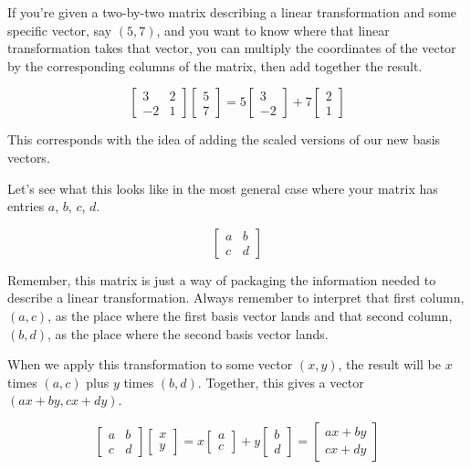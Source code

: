 If you're given a two-by-two matrix describing a linear transformation and some
specific vector, say $(5, 7)$, and you want to know where that linear
transformation takes that vector, you can multiply the coordinates of the vector
by the corresponding columns of the matrix, then add together the result.

\begin{equation*}
  \begin{bmatrix}
    3 & 2 \\
    -2 & 1
  \end{bmatrix}
  \begin{bmatrix}
    5 \\
    7
  \end{bmatrix} = 5\begin{bmatrix}
    3 \\
    -2
  \end{bmatrix} + 7\begin{bmatrix}
    2 \\
    1
  \end{bmatrix}
\end{equation*}

This corresponds with the idea of adding the scaled versions of our new basis
vectors.

Let's see what this looks like in the most general case where your matrix has
entries $a$, $b$, $c$, $d$.

\begin{equation*}
  \begin{bmatrix}
    a & b \\
    c & d
  \end{bmatrix}
\end{equation*}

Remember, this matrix is just a way of packaging the information needed to
describe a linear transformation. Always remember to interpret that first
column, $(a, c)$, as the place where the first basis vector lands and that
second column, $(b, d)$, as the place where the second basis vector lands.

When we apply this transformation to some vector $(x, y)$, the result will be
$x$ times $(a, c)$ plus $y$ times $(b, d)$. Together, this gives a vector
$(ax + by, cx + dy)$.

\begin{equation*}
  \begin{bmatrix}
    a & b \\
    c & d
  \end{bmatrix} \begin{bmatrix}
    x \\
    y
  \end{bmatrix} = x\begin{bmatrix}
    a \\
    c
  \end{bmatrix} + y\begin{bmatrix}
    b \\
    d
  \end{bmatrix} = \begin{bmatrix}
    ax + by \\
    cx + dy
  \end{bmatrix}
\end{equation*}


